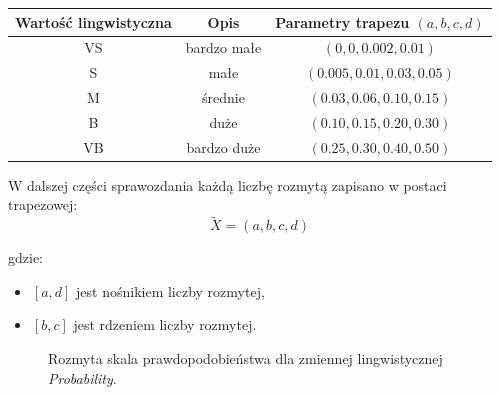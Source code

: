 \documentclass[11pt,a4paper]{article}
\begin{document}
\begin{center}
\begin{tabular}{ccc}
\toprule
Wartość lingwistyczna & Opis & Parametry trapezu $(a,b,c,d)$ \\
\midrule
VS & bardzo małe & $(0,0,0.002,0.01)$ \\
S  & małe & $(0.005,0.01,0.03,0.05)$ \\
M  & średnie & $(0.03,0.06,0.10,0.15)$ \\
B  & duże & $(0.10,0.15,0.20,0.30)$ \\
VB & bardzo duże & $(0.25,0.30,0.40,0.50)$ \\
\bottomrule
\end{tabular}
\end{center}

W dalszej części sprawozdania każdą liczbę rozmytą zapisano w postaci trapezowej:
\[
\tilde{X}=(a,b,c,d)
\]

gdzie:
\begin{itemize}
\item $[a,d]$ jest nośnikiem liczby rozmytej,
\item $[b,c]$ jest rdzeniem liczby rozmytej.
\end{itemize}

\begin{figure}[H]
\centering
{}
\caption{Rozmyta skala prawdopodobieństwa dla zmiennej lingwistycznej \textit{Probability}.}
\label{fig:fuzzy-scale}
\end{figure}
\end{document}
